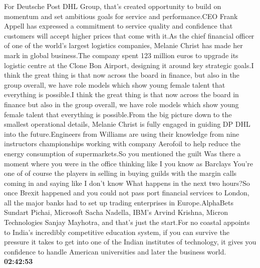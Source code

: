 \documentclass{article}%
\begin{document}
For Deutsche Post DHL Group, that's created opportunity to build on momentum and set ambitious goals for service and performance.CEO Frank Appell has expressed a commitment to service quality and confidence that customers will accept higher prices that come with it.As the chief financial officer of one of the world's largest logistics companies, Melanie Christ has made her mark in global business.The company spent 123 million euros to upgrade its logistic centre at the Clone Bon Airport, designing it around key strategic goals.I think the great thing is that now across the board in finance, but also in the group overall, we have role models which show young female talent that everything is possible.I think the great thing is that now across the board in finance but also in the group overall, we have role models which show young female talent that everything is possible.From the big picture down to the smallest operational details, Melanie Christ is fully engaged in guiding DP DHL into the future.Engineers from Williams are using their knowledge from nine instructors championships working with company Aerofoil to help reduce the energy consumption of supermarkets.So you mentioned the guilt Was there a moment where you were in the office thinking like I you know as Barclays You're one of of course the players in selling in buying guilds with the margin calls coming in and saying like I don't know What happens in the next two hours?So once Brexit happened and you could not pass port financial services to London, all the major banks had to set up trading enterprises in Europe.AlphaBets Sundart Pichai, Microsoft Sacha Nadella, IBM's Arvind Krishna, Micron Technologies Sanjay Mayhotra, and that's just the start.For no coastal appoints to India's incredibly competitive education system, if you can survive the pressure it takes to get into one of the Indian institutes of technology, it gives you confidence to handle American universities and later the business world.%
\textbf{02:42:53}%
\newline%
\end{document}
